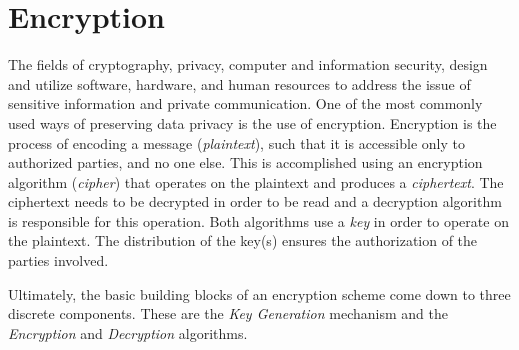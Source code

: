 \section{Encryption}\label{s:encryption}
The fields of cryptography, privacy, computer and information security, design and utilize software, hardware, and human resources to address the issue of sensitive information and private communication.
One of the most commonly used ways of preserving data privacy is the use of encryption. Encryption is the process of encoding a message (\emph{plaintext}), such that it is accessible only to authorized parties, and no one else.
This is accomplished using an encryption algorithm (\emph{cipher}) that operates on the plaintext and produces a \emph{ciphertext}.
The ciphertext needs to be decrypted in order to be read and a decryption algorithm is responsible for this operation.
Both algorithms use a \emph{key} in order to operate on the plaintext.
The distribution of the key(s) ensures the authorization of the parties involved.

Ultimately, the basic building blocks of an encryption scheme come down to three discrete components.
These are the \emph{Key Generation} mechanism and the \emph{Encryption} and \emph{Decryption} algorithms.

